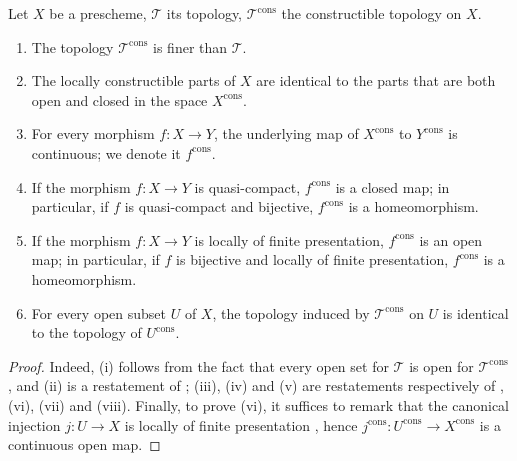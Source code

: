 \begin{proposition}[1.9.14]
\label{IV.1.9.14}
Let $X$ be a prescheme, $\mathscr{T}$ its topology, $\mathscr{T}^{\mathrm{cons}}$ the constructible topology on $X$.
\begin{enumerate}
  \item[\rm(i)] The topology $\mathscr{T}^{\mathrm{cons}}$ is finer than $\mathscr{T}$.
  \item[\rm(ii)] The locally constructible parts of $X$ are identical to the parts that are both open and closed in the space $X^{\mathrm{cons}}$.
  \item[\rm(iii)] For every morphism $f:X\to Y$, the underlying map of $X^{\mathrm{cons}}$ to $Y^{\mathrm{cons}}$ is continuous; we denote it $f^{\mathrm{cons}}$.
  \item[\rm(iv)] If the morphism $f:X\to Y$ is quasi-compact, $f^{\mathrm{cons}}$ is a closed map; in particular, if $f$ is quasi-compact and bijective, $f^{\mathrm{cons}}$ is a homeomorphism.
  \item[\rm(v)] If the morphism $f:X\to Y$ is locally of finite presentation, $f^{\mathrm{cons}}$ is an open map; in particular, if $f$ is bijective and locally of finite presentation, $f^{\mathrm{cons}}$ is a homeomorphism.
  \item[\rm(vi)] For every open subset $U$ of $X$, the topology induced by $\mathscr{T}^{\mathrm{cons}}$ on $U$ is identical to the topology of $U^{\mathrm{cons}}$.
\end{enumerate}
\end{proposition}

\begin{proof}
Indeed, (i) follows from the fact that every open set for $\mathscr{T}$ is open for $\mathscr{T}^{\mathrm{cons}}$ , and (ii) is a restatement of ; (iii), (iv) and (v) are restatements respectively of , (vi), (vii) and (viii).
Finally, to prove (vi), it suffices to remark that the canonical injection $j:U\to X$ is locally of finite presentation , hence $j^{\mathrm{cons}}:U^{\mathrm{cons}}\to X^{\mathrm{cons}}$ is a continuous open map.
\end{proof}

